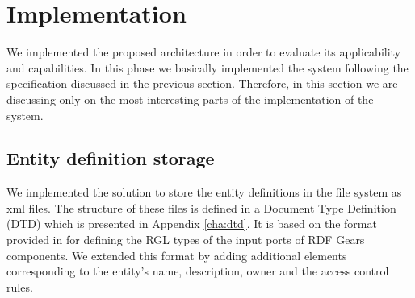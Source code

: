 \section{Implementation}
\label{sec:implStorage}

We implemented the proposed architecture in order to evaluate its applicability and capabilities. In this phase we basically implemented the system following the specification discussed in the previous section. Therefore, in this section we are discussing only on the most interesting parts of the implementation of the system.

\subsection{Entity definition storage}
We implemented the solution to store the entity definitions in the file system as xml files. The structure of these files is defined in a Document Type Definition (DTD) which is presented in Appendix \ref{cha:dtd}. It is based on the format provided in \cite{maro2011} for defining the RGL types of the input ports of RDF Gears components. We extended this format by adding additional elements corresponding to the entity's name, description, owner and the access control rules.

